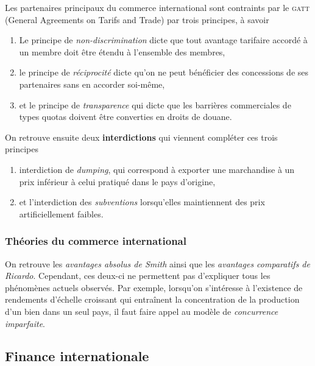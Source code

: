 Les partenaires principaux du commerce international sont contraints par le
\textsc{gatt} (General Agreements on Tarifs and Trade) par trois principes,
à savoir
\begin{enumerate}
  \item Le principe de \emph{non-discrimination} dicte que tout avantage tarifaire accordé
  à un membre doit être étendu à l'ensemble des membres,
  \item le principe de \emph{réciprocité} dicte qu'on ne peut bénéficier des concessions
  de ses partenaires sans en accorder soi-même,
  \item et le principe de \emph{transparence} qui dicte que les barrières commerciales de
  types quotas doivent être converties en droits de douane.
\end{enumerate}
On retrouve ensuite deux \textbf{interdictions} qui viennent compléter ces trois principes
\begin{enumerate}
  \item interdiction de \emph{dumping}, qui correspond à  exporter une marchandise 
  à un prix inférieur à celui pratiqué dans le pays d'origine,
  \item et l'interdiction des \emph{subventions} lorsqu'elles maintiennent des prix
  artificiellement faibles.
\end{enumerate}


\subsubsection{Théories du commerce international} %
\label{ssub:theories_du_commerce_international}
On retrouve les \emph{avantages absolus de Smith} ainsi que
les \emph{avantages comparatifs de Ricardo}.
Cependant, ces deux-ci ne permettent pas d'expliquer tous les phénomènes
actuels observés.
Par exemple, lorsqu'on s'intéresse à l'existence de rendements d'échelle
croissant qui entraînent la concentration de la production d'un bien 
dans un seul pays, il faut faire appel au modèle de \emph{concurrence imparfaite}.




\subsection{Finance internationale} %
\label{sub:finance_internationale}


